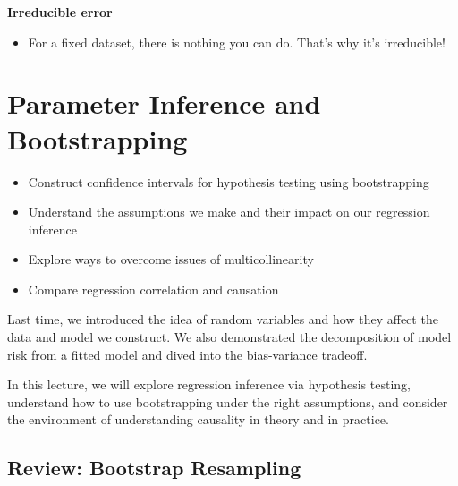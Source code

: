 \documentclass[
  letterpaper,
  DIV=11,
  numbers=noendperiod]{scrreprt}
\providecommand{\tightlist}{%
  \setlength{\itemsep}{0pt}\setlength{\parskip}{0pt}}\usepackage{longtable,booktabs,array}
\begin{document}
\textbf{Irreducible error}

\begin{itemize}
\tightlist
\item
  For a fixed dataset, there is nothing you can do. That's why it's
  irreducible!
\end{itemize}


\chapter{Parameter Inference and
Bootstrapping}\label{parameter-inference-and-bootstrapping}

\begin{tcolorbox}[enhanced jigsaw, arc=.35mm, left=2mm, toprule=.15mm, leftrule=.75mm, bottomrule=.15mm, colframe=quarto-callout-note-color-frame, rightrule=.15mm, colbacktitle=quarto-callout-note-color!10!white, opacitybacktitle=0.6, coltitle=black, bottomtitle=1mm, colback=white, toptitle=1mm, title=\textcolor{quarto-callout-note-color}{\faInfo}\hspace{0.5em}{Learning Outcomes}, breakable, opacityback=0, titlerule=0mm]

\begin{itemize}
\tightlist
\item
  Construct confidence intervals for hypothesis testing using
  bootstrapping
\item
  Understand the assumptions we make and their impact on our regression
  inference
\item
  Explore ways to overcome issues of multicollinearity
\item
  Compare regression correlation and causation
\end{itemize}

\end{tcolorbox}

Last time, we introduced the idea of random variables and how they
affect the data and model we construct. We also demonstrated the
decomposition of model risk from a fitted model and dived into the
bias-variance tradeoff.

In this lecture, we will explore regression inference via hypothesis
testing, understand how to use bootstrapping under the right
assumptions, and consider the environment of understanding causality in
theory and in practice.

\section{Review: Bootstrap
Resampling}\label{review-bootstrap-resampling}
\end{document}
